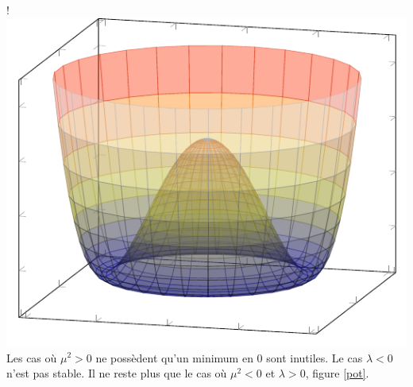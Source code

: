 {{}
\resizebox {\marginparwidth} {!} 
{
	\includegraphics[scale=1]{SM/mp.pdf}
}
\label{profile}
}
Les cas où $\mu^{2}>0$ ne possèdent qu'un minimum en $0$ sont inutiles. Le cas $\lambda<0$ n'est pas stable. Il ne reste plus que le cas où $\mu^{2}<0$ et $\lambda>0$, figure \ref{pot}.

